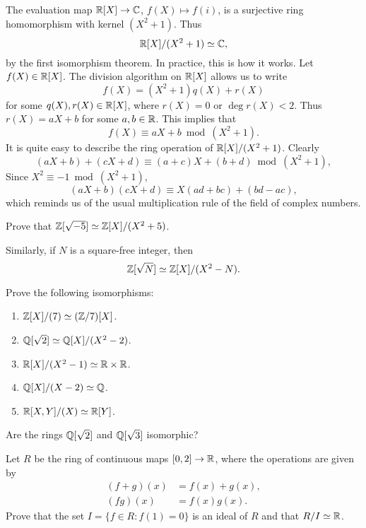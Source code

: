 \begin{example}
    The evaluation map $\mathbb{R}[X]\to\mathbb{C}$, $f(X)\mapsto f(i)$, is a surjective ring
	homomorphism with kernel $(X^2+1)$. Thus 
	\[
	\mathbb{R}[X]/(X^2+1)\simeq\mathbb{C},
	\]
	by the first isomorphism theorem. In practice, this is how it works. Let $f(X)\in\mathbb{R}[X]$. 
	The division algorithm on $\mathbb{R}[X]$ allows us to write
	\[
	f(X)=(X^2+1)q(X)+r(X)
	\]
	for some $q(X),r(X)\in\mathbb{R}[X]$, where $r(X)=0$ or $\deg r(X)<2$. Thus
	$r(X)=aX+b$ for some $a,b\in\mathbb{R}$. This implies that
	\[
	f(X)\equiv aX+b\bmod (X^2+1).
	\] 
	It is quite easy to describe the ring operation of 
	$\mathbb{R}[X]/(X^2+1)$. Clearly 
	\[
	(aX+b)+(cX+d)\equiv (a+c)X+(b+d)\bmod (X^2+1),
	\]
	Since $X^2\equiv -1\bmod (X^2+1)$,   	
	\[
	(aX+b)(cX+d)\equiv X(ad+bc)+(bd-ac), 
	\]
	which reminds us of the usual 
	multiplication rule of the field of complex numbers. 
\end{example}

\begin{exercise}
	Prove that $\mathbb{Z}[\sqrt{-5}]\simeq\mathbb{Z}[X]/(X^2+5)$. 	
\end{exercise}

Similarly, if $N$ is a square-free integer, then 
\[
\mathbb{Z}[\sqrt{N}]\simeq\mathbb{Z}[X]/(X^2-N).
\]

\begin{exercise}
\label{xca:ring_isos}
Prove the following isomorphisms:
\begin{enumerate}
	\item $\mathbb{Z}[X]/(7)\simeq (\mathbb{Z}/7)[X]$.
	\item $\mathbb{Q}[\sqrt{2}]\simeq\mathbb{Q}[X]/(X^2-2)$.
	\item $\mathbb{R}[X]/(X^2-1)\simeq\mathbb{R}\times\mathbb{R}$.
	\item $\mathbb{Q}[X]/(X-2)\simeq\mathbb{Q}$.
	\item $\mathbb{R}[X,Y]/(X)\simeq\mathbb{R}[Y]$. 
\end{enumerate}
\end{exercise}

\begin{exercise}
\label{xca:sqrt2and3}
Are the rings $\mathbb{Q}[\sqrt{2}]$ and $\mathbb{Q}[\sqrt{3}]$ isomorphic?	
\end{exercise}

\begin{exercise}
\label{xca:continuos}
	Let $R$ be the ring of continuous maps $[0,2]\to\mathbb{R}$, where the operations are given by 
	\begin{align*}	    
	(f+g)(x)&=f(x)+g(x),\\
	(fg)(x)&=f(x)g(x).
	\end{align*}
	Prove that the set 
	$I=\{f\in R:f(1)=0\}$ is an ideal of $R$ and that $R/I\simeq\mathbb{R}$.   	
\end{exercise}

